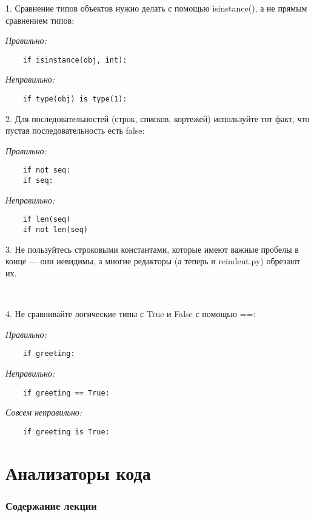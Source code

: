 \documentclass[xcolor=table]{beamer}
\begin{document}
\begin{frame}[fragile]
	1. Сравнение типов объектов нужно делать с помощью isinstance(), а не прямым сравнением типов:
	
	\textit{Правильно:}
	\begin{verbatim}
	if isinstance(obj, int):
	\end{verbatim}
	\textit{Неправильно:}
	\begin{verbatim}
	if type(obj) is type(1):
	\end{verbatim}
	
	2. Для последовательностей (строк, списков, кортежей) используйте тот факт, что пустая последовательность есть false:		
	
	\textit{Правильно:}
	\begin{verbatim}
	if not seq:
	if seq:
	\end{verbatim}
	\textit{Неправильно:}
	\begin{verbatim}
	if len(seq)
	if not len(seq)
	\end{verbatim}
\end{frame}

\begin{frame}[fragile]
	3. Не пользуйтесь строковыми константами, которые имеют важные пробелы в конце — они невидимы, а многие редакторы (а теперь и reindent.py) обрезают их.

	~	
	
	4. Не сравнивайте логические типы с True и False с помощью ==:
	
	\textit{Правильно:}
	\begin{verbatim}
	if greeting:
	\end{verbatim}
	\textit{Неправильно:}
	\begin{verbatim}
	if greeting == True:
	\end{verbatim}
	\textit{Совсем неправильно:}
	\begin{verbatim}
	if greeting is True:
	\end{verbatim}
\end{frame}

\section{Анализаторы кода}

\begin{frame}
  \frametitle{Содержание лекции}
  \tableofcontents[current]
\end{frame}
\end{document}
